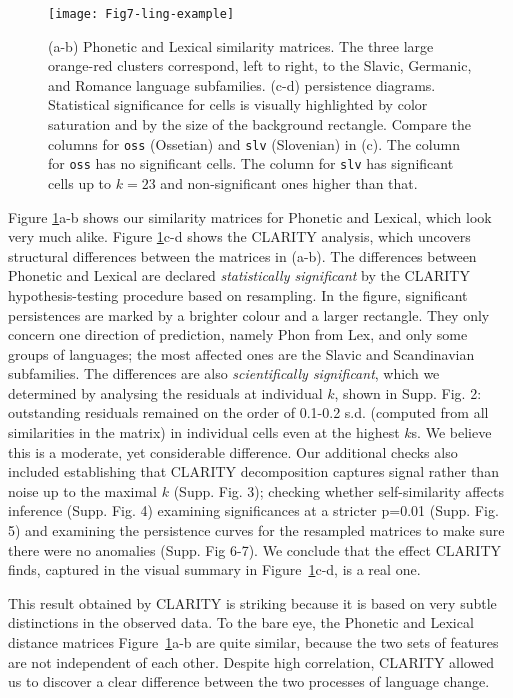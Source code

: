 \documentclass[a4]{article}
\newcommand{\+}[1]{\mathbf{#1}}
\begin{document}
\begin{figure}[!htbp]
\begin{center}
 \centerline{\texttt{[image: Fig7-ling-example]}}
 \caption{(a-b) Phonetic and Lexical similarity matrices. The three large orange-red clusters correspond, left to right, to the Slavic, Germanic, and Romance language subfamilies.
(c-d) persistence diagrams. Statistical significance for cells is visually highlighted by color saturation and by the size of the background rectangle. Compare the columns for \texttt{oss} (Ossetian) and \texttt{slv} (Slovenian) in (c). The column for \texttt{oss} has no significant cells. The column for \texttt{slv} has significant cells up to $k=23$ and non-significant ones higher than that. \label{fig:linguistic}}
\end{center}
\end{figure}

Figure \ref{fig:linguistic}a-b shows our similarity matrices for Phonetic and Lexical, which look very much alike. Figure \ref{fig:linguistic}c-d shows the CLARITY analysis, which uncovers structural differences between the matrices in (a-b). The differences between Phonetic and Lexical are  declared \emph{statistically significant} by the CLARITY hypothesis-testing procedure based on resampling. In the figure, significant persistences are marked by a brighter colour and a larger rectangle. They only concern one direction of prediction, namely Phon from Lex, and only some groups of languages; the most affected ones are the Slavic and Scandinavian subfamilies. The differences are also \emph{scientifically significant}, which we determined by analysing the residuals at individual $k$, shown in Supp. Fig. 2: outstanding residuals remained on the order of 0.1-0.2 s.d. (computed from all similarities in the matrix) in individual cells even at the highest $k$s. We believe this is a moderate, yet considerable difference. Our additional checks also included establishing that CLARITY decomposition captures signal rather than noise up to the maximal $k$ (Supp. Fig. 3); checking whether self-similarity affects inference (Supp. Fig. 4) examining significances at a stricter p=0.01 (Supp. Fig. 5) and examining the persistence curves for the resampled matrices to make sure there were no anomalies (Supp. Fig 6-7). We conclude that the effect CLARITY finds, captured in the visual summary in Figure~\ref{fig:linguistic}c-d, is a real one. 

This result obtained by CLARITY is striking because it is based on very subtle distinctions in the observed data. To the bare eye, the Phonetic and Lexical distance matrices Figure~\ref{fig:linguistic}a-b are quite similar, %
because the two sets of features are not independent of each other. Despite high correlation, CLARITY allowed us to discover a clear difference between the two processes of language change. 
\end{document}
